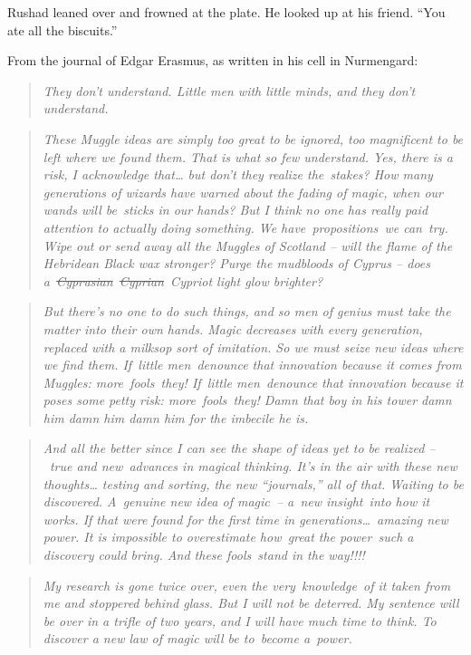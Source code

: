 Rushad leaned over and frowned at the plate. He looked up at his friend.
``You ate all the biscuits.''

\mybreak

From the journal of Edgar Erasmus, as written in his cell in Nurmengard:

\begin{quote}
\emph{They don't understand. Little men with little minds, and they
don't understand.}
\end{quote}

\begin{quote}
\emph{These Muggle ideas are simply too great to be ignored, too
magnificent to be left where we found them. That is what so few
understand. Yes, there is a risk, I acknowledge that\ldots{} but don't
they realize the~stakes? How many generations of wizards have warned
about the fading of magic, when our wands will be~sticks in our hands?
But I think no one has really paid attention to actually doing
something. We have~propositions~we can~try. Wipe out or send away all
the Muggles of Scotland -- will the flame of the Hebridean Black wax
stronger? Purge the mudbloods of Cyprus -- does
a~\st{Cyprusian}~\st{Cyprian}~Cypriot light glow brighter?}
\end{quote}

\begin{quote}
\emph{But there's no one to do such things, and so men of genius must
take the matter into their own hands. Magic decreases with every
generation, replaced with a milksop sort of imitation. So we must seize
new ideas where we find them. If~little men~denounce that innovation
because it comes from Muggles: more~fools~they! If~little men~denounce
that innovation because it poses some petty risk: more~fools~they! Damn
that boy in his tower damn him damn him damn him for the imbecile he
is.}
\end{quote}

\begin{quote}
\emph{And all the better since I can see the shape of ideas yet to be
realized --~true and new~advances in magical thinking. It's in the air
with these new thoughts\ldots{} testing and sorting, the new
``journals,'' all of that. Waiting to be discovered. A~genuine new idea
of magic~-- a~new insight~into how it works. If that were found for the
first time in generations\ldots~amazing new power. It is impossible to
overestimate how~great the power~such a discovery could bring. And these
fools~stand in the way!!!!}
\end{quote}

\begin{quote}
\emph{My research is gone twice over, even the very~knowledge~of it
taken from me and stoppered behind glass. But I will not be deterred. My
sentence will be over in a trifle of two years, and I will have much
time to think. To discover a new law of magic will be to~become
a~power.}
\end{quote}
